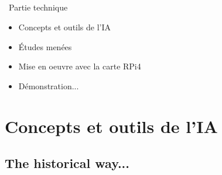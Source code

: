 \documentclass[11pt,serif,mathserif,compress,hyperref={colorlinks}]{beamer}
\title[\hspace*{.8\linewidth}\insertframenumber/\inserttotalframenumber]
{\\\medskip\fontsize{17}{17}\selectfont{\textbf{Projet UCIA}}
}
\subtitle{\bigskip\fontsize{12}{12}\selectfont{COPIL du 6 janvier 2025\\\smallskip Partie technique}
}
\author[{\tiny JLC -- 2025/01/06}\hspace*{.8\linewidth}]
       {\fontsize{12}{12}\selectfont{Jean-Luc.Charles\,@\,mailo.com} %
       }
\institute{}
\date{}
\begin{document}
\renewcommand{\ttdefault}[0]{lmtt}
\newcommand{\boldtt}[1]{{\ttfamily\bfseries #1}}

\frame[plain]{\titlepage}


\begin{frame}{}
  
  \begin{bclogo}[noborder=true, couleur=gray!50, couleurBarre=Chocolate, logo=\bctrombone, marge=0, margeG=-0.5]
    {\ Partie technique}
    \medskip
    \begin{itemize}
    \item Concepts et outils de l'IA \smallskip
    \item Études menées \smallskip
    \item Mise en oeuvre avec la carte RPi4 \smallskip
    \item Démonstration... \smallskip
    \end{itemize}
  \end{bclogo}
  
\end{frame}

\section{Concepts et outils de l'IA}

\subsection{The historical way...}
\end{document}
